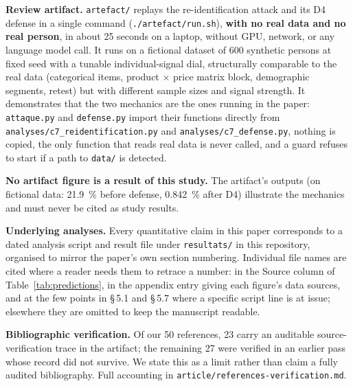 \documentclass[sigconf,anonymous,review]{acmart}
\begin{document}
\begin{openscience}

\begin{sloppypar}

\textbf{Review artifact.} \texttt{artefact/\allowbreak{}} replays the re-identification attack and its D4 defense in a single command (\texttt{\allowbreak{}./\allowbreak{}artefact/\allowbreak{}run\allowbreak{}.sh}), \textbf{with no real data and no real person}, in about 25 seconds on a laptop, without GPU, network, or any language model call. It runs on a fictional dataset of 600 synthetic persons at fixed seed with a tunable individual-signal dial, structurally comparable to the real data (categorical items, product $\times$ price matrix block, demographic segments, retest) but with different sample sizes and signal strength. It demonstrates that the two mechanics are the ones running in the paper: \texttt{attaque\allowbreak{}.py} and \texttt{defense\allowbreak{}.py} import their functions directly from \texttt{analyses/\allowbreak{}c7\_\allowbreak{}reidentification\allowbreak{}.py} and \texttt{analyses/\allowbreak{}c7\_\allowbreak{}defense\allowbreak{}.py}, nothing is copied, the only function that reads real data is never called, and a guard refuses to start if a path to \texttt{data/\allowbreak{}} is detected.

\textbf{No artifact figure is a result of this study.} The artifact's outputs (on fictional data: 21.9~\% before defense, 0.842~\% after D4) illustrate the mechanics and must never be cited as study results.

\textbf{Underlying analyses.} Every quantitative claim in this paper corresponds to a dated analysis script and result file under \texttt{resultats/\allowbreak{}} in this repository, organised to mirror the paper's own section numbering. Individual file names are cited where a reader needs them to retrace a number: in the Source column of Table~\ref{tab:predictions}, in the appendix entry giving each figure's data sources, and at the few points in \S\,5.1 and \S\,5.7 where a specific script line is at issue; elsewhere they are omitted to keep the manuscript readable.

\textbf{Bibliographic verification.} Of our 50 references, 23 carry an auditable source-verification trace in the artifact; the remaining 27 were verified in an earlier pass whose record did not survive. We state this as a limit rather than claim a fully audited bibliography. Full accounting in \texttt{article/\allowbreak{}references-\allowbreak{}verification\allowbreak{}.md}.


\end{sloppypar}
\end{openscience}
\end{document}
